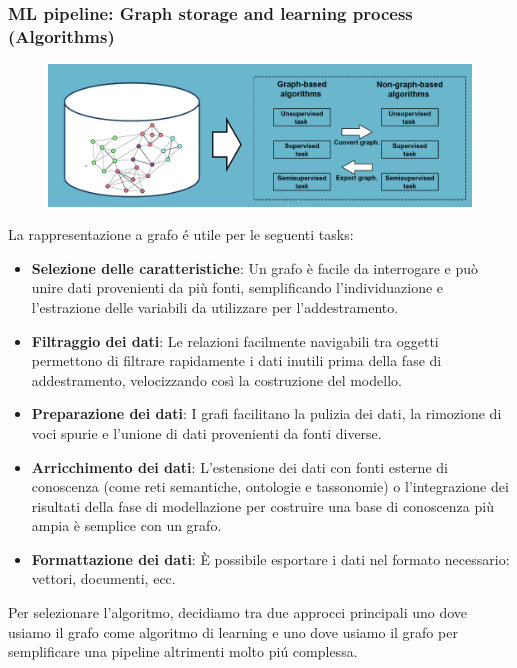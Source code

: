 \subsubsection*{ML pipeline: Graph storage and learning process (Algorithms)}
\begin{figure}[th]
    \centering
    \includegraphics[width=0.6\linewidth]{ML&Graphs//img/graphstorage.png}
\end{figure}
La rappresentazione a grafo é utile per le seguenti tasks:
\begin{itemize}
  \item \textbf{Selezione delle caratteristiche}: Un grafo è facile da interrogare e può unire dati provenienti da più fonti, semplificando l'individuazione e l'estrazione delle variabili da utilizzare per l'addestramento.
  
  \item \textbf{Filtraggio dei dati}: Le relazioni facilmente navigabili tra oggetti permettono di filtrare rapidamente i dati inutili prima della fase di addestramento, velocizzando così la costruzione del modello.
  
  \item \textbf{Preparazione dei dati}: I grafi facilitano la pulizia dei dati, la rimozione di voci spurie e l'unione di dati provenienti da fonti diverse.
  
  \item \textbf{Arricchimento dei dati}: L'estensione dei dati con fonti esterne di conoscenza (come reti semantiche, ontologie e tassonomie) o l'integrazione dei risultati della fase di modellazione per costruire una base di conoscenza più ampia è semplice con un grafo.
  
  \item \textbf{Formattazione dei dati}: È possibile esportare i dati nel formato necessario: vettori, documenti, ecc.
\end{itemize}

Per selezionare l'algoritmo, decidiamo tra due approcci principali uno dove usiamo il grafo come algoritmo di learning e uno dove usiamo il grafo per semplificare una pipeline altrimenti molto piú complessa. 

